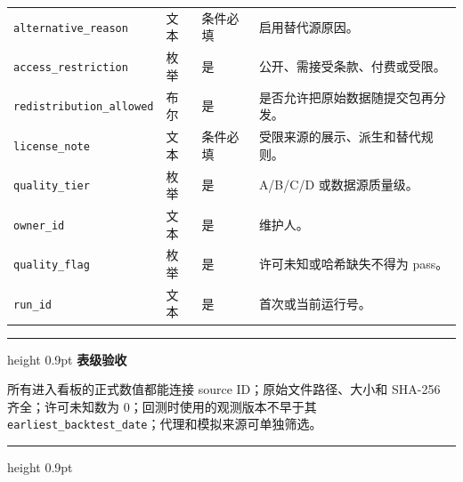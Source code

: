 \documentclass[UTF8,fontset=windows,12pt,openany]{ctexbook}
\newenvironment{gatebox}[1][]{%
  \par\medskip\noindent\begin{center}\begin{minipage}{0.93\textwidth}%
  \color{GoldLine}\hrule height 0.9pt\vspace{0.45em}%
  \textbf{#1}\par\smallskip\color{black}%
}{%
  \par\vspace{0.35em}\color{GoldLine}\hrule height 0.9pt%
  \end{minipage}\end{center}\medskip%
}
\newcommand{\Field}[1]{{\small\nolinkurl{#1}}}
\begin{document}
\begin{longtable}{p{3.7cm}p{2.3cm}p{2.1cm}p{5.1cm}}
\Field{alternative_reason} & 文本 & 条件必填 & 启用替代源原因。\\
\Field{access_restriction} & 枚举 & 是 & 公开、需接受条款、付费或受限。\\
\Field{redistribution_allowed} & 布尔 & 是 & 是否允许把原始数据随提交包再分发。\\
\Field{license_note} & 文本 & 条件必填 & 受限来源的展示、派生和替代规则。\\
\Field{quality_tier} & 枚举 & 是 & A/B/C/D 或数据源质量级。\\
\Field{owner_id} & 文本 & 是 & 维护人。\\
\Field{quality_flag} & 枚举 & 是 & 许可未知或哈希缺失不得为 pass。\\
\Field{run_id} & 文本 & 是 & 首次或当前运行号。\\
\bottomrule
\end{longtable}

\begin{gatebox}[表级验收]
所有进入看板的正式数值都能连接 source ID；原始文件路径、大小和 SHA-256 齐全；许可未知数为 0；回测时使用的观测版本不早于其 \Field{earliest_backtest_date}；代理和模拟来源可单独筛选。
\end{gatebox}
\end{document}
